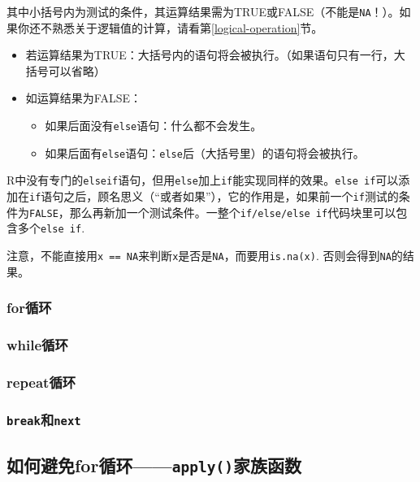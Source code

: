 \documentclass[]{book}
\providecommand{\tightlist}{%
  \setlength{\itemsep}{0pt}\setlength{\parskip}{0pt}}
\begin{document}
其中小括号内为测试的条件，其运算结果需为TRUE或FALSE（不能是\texttt{NA}！）。如果你还不熟悉关于逻辑值的计算，请看第\ref{logical-operation}节。

\begin{itemize}
\item
  若运算结果为TRUE：大括号内的语句将会被执行。（如果语句只有一行，大括号可以省略）
\item
  如运算结果为FALSE：

  \begin{itemize}
  \tightlist
  \item
    如果后面没有\texttt{else}语句：什么都不会发生。
  \item
    如果后面有\texttt{else}语句：\texttt{else}后（大括号里）的语句将会被执行。
  \end{itemize}
\end{itemize}

R中没有专门的\texttt{elseif}语句，但用\texttt{else}加上\texttt{if}能实现同样的效果。\texttt{else\ if}可以添加在\texttt{if}语句之后，顾名思义（``或者如果''），它的作用是，如果前一个\texttt{if}测试的条件为\texttt{FALSE}，那么再新加一个测试条件。一整个\texttt{if/else/else\ if}代码块里可以包含多个\texttt{else\ if}.

注意，不能直接用\texttt{x\ ==\ NA}来判断\texttt{x}是否是\texttt{NA}，而要用\texttt{is.na(x)}. 否则会得到\texttt{NA}的结果。

\hypertarget{for-1}{%
\subsubsection{for循环}\label{for-1}}

\hypertarget{while-1}{%
\subsubsection{while循环}\label{while-1}}

\hypertarget{repeat}{%
\subsubsection{repeat循环}\label{repeat}}

\hypertarget{breaknext}{%
\subsubsection{\texorpdfstring{\texttt{break}和\texttt{next}}{break和next}}\label{breaknext}}

\hypertarget{apply}{%
\subsection{\texorpdfstring{如何避免for循环------\texttt{apply()}家族函数}{如何避免for循环------apply()家族函数}}\label{apply}}
\end{document}
